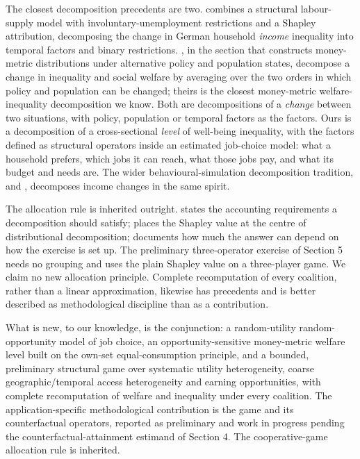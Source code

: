 \documentclass[11pt,a4paper]{article}
\begin{document}
The closest decomposition precedents are two. \citet{muehlhan2023} combines a structural labour-supply model with involuntary-unemployment restrictions and a Shapley attribution, decomposing the change in German household \emph{income} inequality into temporal factors and binary restrictions. \citet{creedyherault2011}, in the section that constructs money-metric distributions under alternative policy and population states, decompose a change in inequality and social welfare by averaging over the two orders in which policy and population can be changed; theirs is the closest money-metric welfare-inequality decomposition we know. Both are decompositions of a \emph{change} between two situations, with policy, population or temporal factors as the factors. Ours is a decomposition of a cross-sectional \emph{level} of well-being inequality, with the factors defined as structural operators inside an estimated job-choice model: what a household prefers, which jobs it can reach, what those jobs pay, and what its budget and needs are. The wider behavioural-simulation decomposition tradition, \citet{bargain2012} and \citet{jessen2019}, decomposes income changes in the same spirit.

The allocation rule is inherited outright. \citet{shorrocks1982} states the accounting requirements a decomposition should satisfy; \citet{shorrocks2013} places the Shapley value at the centre of distributional decomposition; \citet{sastretrannoy2002} documents how much the answer can depend on how the exercise is set up. The preliminary three-operator exercise of Section 5 needs no grouping and uses the plain Shapley value on a three-player game. We claim no new allocation principle. Complete recomputation of every coalition, rather than a linear approximation, likewise has precedents and is better described as methodological discipline than as a contribution.

What is new, to our knowledge, is the conjunction: a random-utility random-opportunity model of job choice, an opportunity-sensitive money-metric welfare level built on the own-set equal-consumption principle, and a bounded, preliminary structural game over systematic utility heterogeneity, coarse geographic/temporal access heterogeneity and earning opportunities, with complete recomputation of welfare and inequality under every coalition. The application-specific methodological contribution is the game and its counterfactual operators, reported as preliminary and work in progress pending the counterfactual-attainment estimand of Section 4. The cooperative-game allocation rule is inherited.
\end{document}
